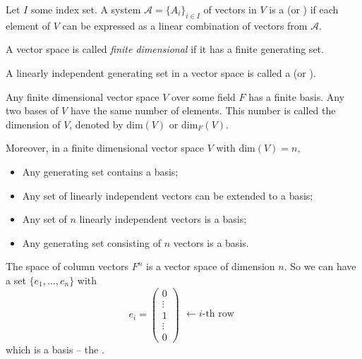 \begin{definition}
	Let $I$ some index set. A system $\mathcal{A} = \{A_i\}_{i \in I}$ of vectors in $V$ is a  (or ) if each element of $V$ can be expressed as a linear combination of vectors from $\mathcal{A}$.
	
	A vector space is called \emph{finite dimensional} if it has a finite generating set.
\end{definition}

\begin{definition}
	A linearly independent generating set in a vector space is called a  (or ).
\end{definition}

\begin{theorem}
	Any finite dimensional vector space $V$ over some field $F$ has a finite basis. Any two bases of $V$ have the same number of elements. This number is called the dimension of $V$, denoted by $\text{dim}(V)$ or $\text{dim}_F(V)$.
\end{theorem}

Moreover, in a finite dimensional vector space $V$ with $\text{dim}(V) = n$,
\begin{itemize}
	\item Any generating set contains a basis;
	\item Any set of linearly independent vectors can be extended to a basis;
	\item Any set of $n$ linearly independent vectors is a basis;
	\item Any generating set consisting of $n$ vectors is a basis.
\end{itemize}

\begin{example}
	The space of column vectors $F^n$ is a vector space of dimension $n$. So we can have a set $\{e_1, \ldots, e_n\}$ with
	\[
		e_i =
		\begin{pmatrix}
			0 \\
			\vdots \\
			1 \\
			\vdots \\
			0
		\end{pmatrix}
		\begin{matrix}
			 \\
			 \\
			\leftarrow i\text{-th row} \\
			 \\
			 \\
		\end{matrix}
	\]
	which is a basis -- the .
\end{example}
